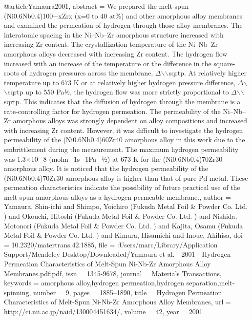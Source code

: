 @article{Yamaura2001,
abstract = {We prepared the melt-spun (Ni0.6Nb0.4)100−xZrx (x=0 to 40 at{\%}) and other amorphous alloy membranes and examined the permeation of hydrogen through those alloy membranes. The interatomic spacing in the Ni–Nb–Zr amorphous structure increased with increasing Zr content. The crystallization temperature of the Ni–Nb–Zr amorphous alloys decreased with increasing Zr content. The hydrogen flow increased with an increase of the temperature or the difference in the square-roots of hydrogen pressures across the membrane, $\Delta$$\backslash$$\backslash$sqrtp. At relatively higher temperature up to 673 K or at relatively higher hydrogen pressure difference, $\Delta$$\backslash$$\backslash$sqrtp up to 550 Pa1⁄2, the hydrogen flow was more strictly proportional to $\Delta$$\backslash$$\backslash$sqrtp. This indicates that the diffusion of hydrogen through the membrane is a rate-controlling factor for hydrogen permeation. The permeability of the Ni–Nb–Zr amorphous alloys was strongly dependent on alloy compositions and increased with increasing Zr content. However, it was difficult to investigate the hydrogen permeability of the (Ni0.6Nb0.4)60Zr40 amorphous alloy in this work due to the embrittlement during the measurement. The maximum hydrogen permeability was 1.3×10−8 (mol{\textperiodcentered}m−1{\textperiodcentered}s−1{\textperiodcentered}Pa−1⁄2) at 673 K for the (Ni0.6Nb0.4)70Zr30 amorphous alloy. It is noticed that the hydrogen permeability of the (Ni0.6Nb0.4)70Zr30 amorphous alloy is higher than that of pure Pd metal. These permeation characteristics indicate the possibility of future practical use of the melt-spun amorphous alloys as a hydrogen permeable membrane.},
author = {Yamaura, Shin-ichi and Shimpo, Yoichiro (Fukuda Metal Foil {\&} Powder Co. Ltd. ) and Okouchi, Hitoshi (Fukuda Metal Foil {\&} Powder Co. Ltd. ) and Nishida, Motonori (Fukuda Metal Foil {\&} Powder Co. Ltd. ) and Kajita, Osamu (Fukuda Metal Foil {\&} Powder Co. Ltd. ) and Kimura, Hisamichi and Inoue, Akihisa},
doi = {10.2320/matertrans.42.1885},
file = {:Users/marc/Library/Application Support/Mendeley Desktop/Downloaded/Yamaura et al. - 2001 - Hydrogen Permeation Characteristics of Melt-Spun Ni-Nb-Zr Amorphous Alloy Membranes.pdf:pdf},
issn = {1345-9678},
journal = {Materials Transactions},
keywords = {amorphous alloy,hydrogen permeation,hydrogen separation,melt-spinning},
number = {9},
pages = {1885--1890},
title = {{Hydrogen Permeation Characteristics of Melt-Spun Ni-Nb-Zr Amorphous Alloy Membranes}},
url = {http://ci.nii.ac.jp/naid/130004451634/},
volume = {42},
year = {2001}
}
